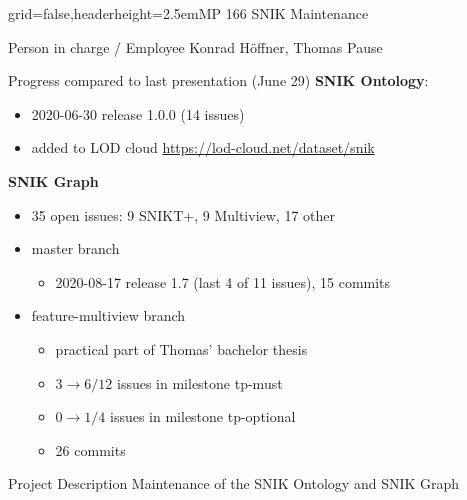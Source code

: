 \documentclass[english]{kiesgrube}
\begin{document}

\newpage

\begin{poster}{grid=false,headerheight=2.5em}{}{MP 166 SNIK Maintenance}{}{}
\begin{posterbox}[name=person,column=0,row=0]{Person in charge / Employee}
Konrad Höffner, Thomas Pause
\end{posterbox}
\begin{posterbox}[name=progress,below=person]{Progress compared to last presentation (June 29)}
\small
\textbf{SNIK Ontology}:
\begin{itemize}
\item 2020-06-30 release 1.0.0 (14 issues)
\item added to LOD cloud \url{https://lod-cloud.net/dataset/snik}
\end{itemize}
\textbf{SNIK Graph}
\begin{itemize}
\item 35 open issues: 9 SNIKT+, 9 Multiview, 17 other
\item master branch
\begin{itemize}
\item 2020-08-17 release 1.7 (last 4 of 11 issues), 15 commits
\end{itemize}
\item feature-multiview branch
\begin{itemize}
\item practical part of Thomas' bachelor thesis
\item $3 \rightarrow 6 / 12$ issues in milestone tp-must
\item $0 \rightarrow 1 / 4$ issues in milestone tp-optional
\item 26 commits
\end{itemize}
\end{itemize}
\end{posterbox}
\begin{posterbox}[name=description,column=1,row=0]{Project Description}
Maintenance of the SNIK Ontology and SNIK Graph

\end{posterbox}
\end{poster}
\end{document}
